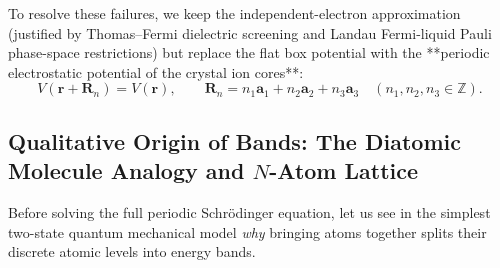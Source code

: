 \documentclass[11pt,a4paper]{article}
\newcommand{\vb}[1]{\mathbf{#1}}
\newcommand{\RR}{\mathbf{R}}
\newcommand{\rvec}{\mathbf{r}}
\begin{document}
To resolve these failures, we keep the independent-electron approximation (justified by Thomas--Fermi dielectric screening and Landau Fermi-liquid Pauli phase-space restrictions) but replace the flat box potential with the **periodic electrostatic potential of the crystal ion cores**:
\begin{equation}
    V(\rvec + \RR_n) = V(\rvec), \qquad \RR_n = n_1\vb{a}_1 + n_2\vb{a}_2 + n_3\vb{a}_3 \quad (n_1, n_2, n_3 \in \mathbb{Z}).
    \label{eq:periodic_potential_def}
\end{equation}

\subsection{Qualitative Origin of Bands: The Diatomic Molecule Analogy and \texorpdfstring{$N$}{N}-Atom Lattice}
Before solving the full periodic Schr\"odinger equation, let us see in the simplest two-state quantum mechanical model \emph{why} bringing atoms together splits their discrete atomic levels into energy bands.
\end{document}
